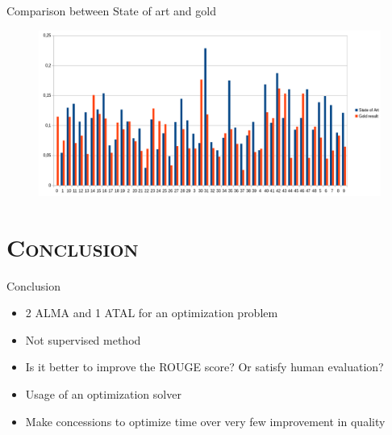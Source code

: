 \documentclass[xcolor=x11names,compress]{beamer}
\renewcommand{\(}{\begin{columns}}
\renewcommand{\)}{\end{columns}}
\newcommand{\<}[1]{\begin{column}{#1}}
\renewcommand{\>}{\end{column}}
\begin{document}
\begin{frame}{Comparison between State of art and gold}
	\begin{figure}[!h]
    	\includegraphics[width=1\linewidth]{graph.png}
    \end{figure}
\end{frame}

\section{\scshape Conclusion}
\begin{frame}{Conclusion}

\begin{itemize}
\item 2 ALMA and 1 ATAL for an optimization problem
\item Not supervised method
\item Is it better to improve the ROUGE score? Or satisfy human evaluation?
\end{itemize}
\begin{itemize}
\item Usage of an optimization solver
\item Make concessions to optimize time over very few improvement in quality
\end{itemize}
\end{frame}
\end{document}

